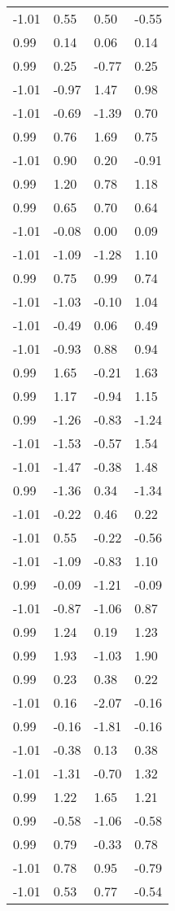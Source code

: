 \documentclass[
  doc,draftall]{apa6}
\begin{document}
\begin{table}[tbp]
\begin{center}
\begin{threeparttable}
\begin{tabular}{llll}
-1.01 & 0.55 & 0.50 & -0.55\\
0.99 & 0.14 & 0.06 & 0.14\\
0.99 & 0.25 & -0.77 & 0.25\\
-1.01 & -0.97 & 1.47 & 0.98\\
-1.01 & -0.69 & -1.39 & 0.70\\
0.99 & 0.76 & 1.69 & 0.75\\
-1.01 & 0.90 & 0.20 & -0.91\\
0.99 & 1.20 & 0.78 & 1.18\\
0.99 & 0.65 & 0.70 & 0.64\\
-1.01 & -0.08 & 0.00 & 0.09\\
-1.01 & -1.09 & -1.28 & 1.10\\
0.99 & 0.75 & 0.99 & 0.74\\
-1.01 & -1.03 & -0.10 & 1.04\\
-1.01 & -0.49 & 0.06 & 0.49\\
-1.01 & -0.93 & 0.88 & 0.94\\
0.99 & 1.65 & -0.21 & 1.63\\
0.99 & 1.17 & -0.94 & 1.15\\
0.99 & -1.26 & -0.83 & -1.24\\
-1.01 & -1.53 & -0.57 & 1.54\\
-1.01 & -1.47 & -0.38 & 1.48\\
0.99 & -1.36 & 0.34 & -1.34\\
-1.01 & -0.22 & 0.46 & 0.22\\
-1.01 & 0.55 & -0.22 & -0.56\\
-1.01 & -1.09 & -0.83 & 1.10\\
0.99 & -0.09 & -1.21 & -0.09\\
-1.01 & -0.87 & -1.06 & 0.87\\
0.99 & 1.24 & 0.19 & 1.23\\
0.99 & 1.93 & -1.03 & 1.90\\
0.99 & 0.23 & 0.38 & 0.22\\
-1.01 & 0.16 & -2.07 & -0.16\\
0.99 & -0.16 & -1.81 & -0.16\\
-1.01 & -0.38 & 0.13 & 0.38\\
-1.01 & -1.31 & -0.70 & 1.32\\
0.99 & 1.22 & 1.65 & 1.21\\
0.99 & -0.58 & -1.06 & -0.58\\
0.99 & 0.79 & -0.33 & 0.78\\
-1.01 & 0.78 & 0.95 & -0.79\\
-1.01 & 0.53 & 0.77 & -0.54\\

\end{tabular}
\end{threeparttable}
\end{center}
\end{table}
\end{document}
